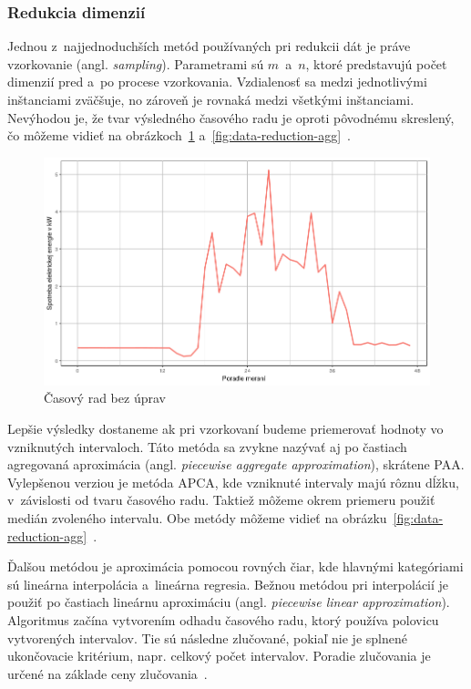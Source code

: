 \documentclass[a4paper,twoside,slovak,12pt,appendix]{article}
\begin{document}
\subsubsection{Redukcia dimenzií}
Jednou z~najjednoduchších metód používaných pri redukcii dát je práve
vzorkovanie (angl. \textit{sampling}). Parametrami sú $m$~a~$n$, ktoré
predstavujú počet dimenzií pred a~po procese vzorkovania. Vzdialenosť sa medzi
jednotlivými inštanciami zväčšuje, no zároveň je rovnaká medzi všetkými
inštanciami. Nevýhodou je, že tvar výsledného časového radu je oproti pôvodnému
skreslený, čo môžeme vidieť na obrázkoch~\ref{fig:data-reduction-orig}
a~\ref{fig:data-reduction-agg}~\cite{Fu2011}.

\begin{figure}[htbp]
  \centering
  \includegraphics[width=\textwidth]{data_reduction_orig.png}
  \caption{Časový rad bez úprav}
  \label{fig:data-reduction-orig}
\end{figure}

Lepšie výsledky dostaneme ak pri vzorkovaní budeme priemerovať hodnoty vo
vzniknutých intervaloch. Táto metóda sa zvykne nazývať aj po častiach agregovaná
aproximácia (angl. \textit{piecewise aggregate approximation}), skrátene PAA.
Vylepšenou verziou je metóda APCA, kde vzniknuté intervaly majú rôznu dĺžku,
v~závislosti od tvaru časového radu. Taktiež môžeme okrem priemeru použiť medián
zvoleného intervalu. Obe metódy môžeme vidieť na
obrázku~\ref{fig:data-reduction-agg}~\cite{Keogh2002}.

Ďalšou metódou je aproximácia pomocou rovných čiar, kde hlavnými kategóriami sú
lineárna interpolácia a~lineárna regresia. Bežnou metódou pri interpolácií je
použiť po častiach lineárnu aproximáciu (angl. \textit{piecewise linear
approximation}). Algoritmus začína vytvorením odhadu časového radu, ktorý
používa polovicu vytvorených intervalov. Tie sú následne zlučované, pokiaľ nie
je splnené ukončovacie kritérium, napr. celkový počet intervalov. Poradie
zlučovania je určené na základe ceny zlučovania~\cite{Fu2011}.
\end{document}
